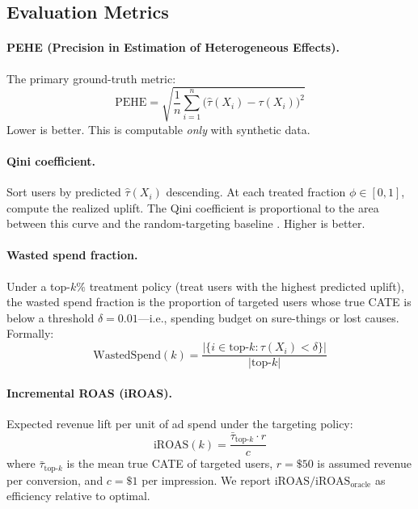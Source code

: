 \documentclass[10pt]{article}
\newcommand{\PEHE}{\text{PEHE}}
\newcommand{\iROAS}{\text{iROAS}}
\begin{document}
\subsection{Evaluation Metrics}
\label{sec:metrics}

\paragraph{PEHE (Precision in Estimation of Heterogeneous Effects).}
The primary ground-truth metric:
%
\begin{equation}
  \PEHE = \sqrt{\frac{1}{n}\sum_{i=1}^n \bigl(\hat\tau(X_i) - \tau(X_i)\bigr)^2}
\end{equation}
%
Lower is better. This is computable \emph{only} with synthetic data.

\paragraph{Qini coefficient.}
Sort users by predicted $\hat\tau(X_i)$ descending. At each treated fraction
$\phi \in [0,1]$, compute the realized uplift. The Qini coefficient is
proportional to the area between this curve and the random-targeting baseline
\citep{radcliffe2007using}. Higher is better.

\paragraph{Wasted spend fraction.}
Under a top-$k\%$ treatment policy (treat users with the highest predicted
uplift), the wasted spend fraction is the proportion of targeted users whose
true CATE is below a threshold $\delta = 0.01$---i.e., spending budget on
sure-things or lost causes. Formally:
%
\begin{equation}
  \text{WastedSpend}(k) =
  \frac{|\{i \in \text{top-}k : \tau(X_i) < \delta\}|}{|\text{top-}k|}
\end{equation}
%
\paragraph{Incremental ROAS (iROAS).}
Expected revenue lift per unit of ad spend under the targeting policy:
%
\begin{equation}
  \iROAS(k) = \frac{\bar\tau_{\text{top-}k} \cdot r}{c}
\end{equation}
%
where $\bar\tau_{\text{top-}k}$ is the mean true CATE of targeted users,
$r = \$50$ is assumed revenue per conversion, and $c = \$1$ per impression.
We report $\iROAS / \iROAS_{\text{oracle}}$ as efficiency relative to optimal.
\end{document}
